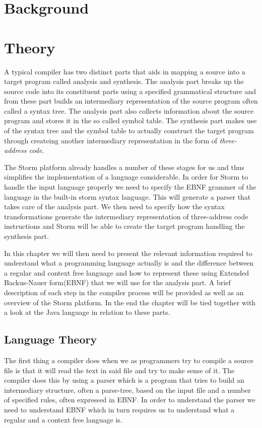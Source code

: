 \documentclass{sigchi}
\begin{document}
\section{Background}
\todo[inline]{}


\section{Theory}
A typical compiler has two distinct parts that aids in mapping a source into a target program called analysis and synthesis. The analysis part breaks up the source code into its constituent parts using a specified grammatical structure and from these part builds an intermediary representation of the source program often called a syntax tree. The analysis part also collects information about the source program and stores it in the so called symbol table. The synthesis part makes use of the syntax tree and the symbol table to actually construct the target program through createing another intermediary representation in the form of \emph{three-address code}\cite{dragon}.

The Storm platform already handles a number of these stages for us and thus simplifies the implementation of a language considerable. In order for Storm to handle the input language properly we need to specify the EBNF grammer of the language in the built-in storm syntax language. This will generate a parser that takes care of the analysis part. We then need to specify how the syntax transformations generate the intermediary representation of three-address code instructions and Storm will be able to create the target program handling the synthesis part.

In this chapter we will then need to present the relevant information required to understand what a programming language actually is and the difference between a regular and context free language and how to represent these using Extended Backus-Nauer form(EBNF) that we will use for the analysis part. A brief description of each step in the compiler process will be provided as well as an overview of the Storm platform. In the end the chapter will be tied together with a look at the Java language in relation to these parts.
\subsection{Language Theory}
The first thing a compiler does when we as programmers try to compile a source file is that it will read the text in said file and try to make sense of it. The compiler does this by using a parser which is a program that tries to build an intermediary structure, often a parse-tree, based on the input file and a number of specified rules, often expressed in EBNF. In order to understand the parser we need to understand EBNF which in turn requires us to understand what a regular and a context free language is.
\end{document}
